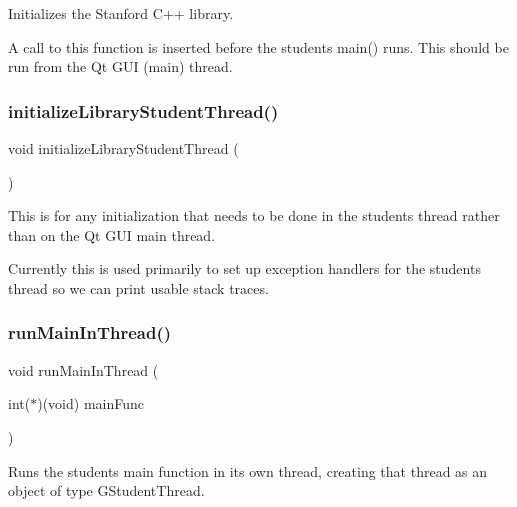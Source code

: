 Initializes the Stanford C++ library. 

A call to this function is inserted before the student\textquotesingle{}s main() runs. This should be run from the Qt G\+UI (main) thread. \mbox{\label{namespacestanfordcpplib_a7f8902f8cc454ef116685dbc6008704a}} 
\subsubsection{\texorpdfstring{initialize\+Library\+Student\+Thread()}{initializeLibraryStudentThread()}}
{\footnotesize\ttfamily void initialize\+Library\+Student\+Thread (\begin{DoxyParamCaption}{ }\end{DoxyParamCaption})}



This is for any initialization that needs to be done in the student\textquotesingle{}s thread rather than on the Qt G\+UI main thread. 

Currently this is used primarily to set up exception handlers for the student\textquotesingle{}s thread so we can print usable stack traces. \mbox{\label{namespacestanfordcpplib_ab6f7bb8a7230f2d95cf1ff0d6f2fbf0e}} 
\subsubsection{\texorpdfstring{run\+Main\+In\+Thread()}{runMainInThread()}}
{\footnotesize\ttfamily void run\+Main\+In\+Thread (\begin{DoxyParamCaption}\item[{int($\ast$)(void)}]{main\+Func }\end{DoxyParamCaption})}



Runs the student\textquotesingle{}s main function in its own thread, creating that thread as an object of type G\+Student\+Thread. 

\mbox{\label{namespacestanfordcpplib_a647c2bc343e4e0d30483590a58ad3884}} 
